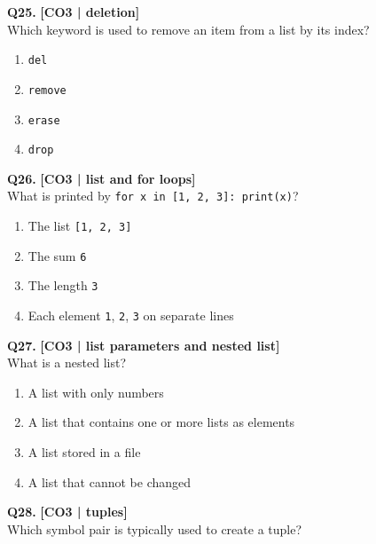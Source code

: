 \noindent\textbf{Q25.} \hfill {\small\color{LPUOrange}\textbf{[CO3 | deletion]}}\\[2pt]
Which keyword is used to remove an item from a list by its index?

\begin{enumerate}[label=(\alph*),topsep=2pt,itemsep=1pt,partopsep=0pt,parsep=0pt]
    \item \relax \texttt{del}
    \item \relax \texttt{remove}
    \item \relax \texttt{erase}
    \item \relax \texttt{drop}
\end{enumerate}
\vspace{{2mm}}

\noindent\textbf{Q26.} \hfill {\small\color{LPUOrange}\textbf{[CO3 | list and for loops]}}\\[2pt]
What is printed by \texttt{for x in [1, 2, 3]: print(x)}?

\begin{enumerate}[label=(\alph*),topsep=2pt,itemsep=1pt,partopsep=0pt,parsep=0pt]
    \item \relax The list \texttt{[1, 2, 3]}
    \item \relax The sum \texttt{6}
    \item \relax The length \texttt{3}
    \item \relax Each element \texttt{1}, \texttt{2}, \texttt{3} on separate lines
\end{enumerate}
\vspace{{2mm}}

\noindent\textbf{Q27.} \hfill {\small\color{LPUOrange}\textbf{[CO3 | list parameters and nested list]}}\\[2pt]
What is a nested list?

\begin{enumerate}[label=(\alph*),topsep=2pt,itemsep=1pt,partopsep=0pt,parsep=0pt]
    \item \relax A list with only numbers
    \item \relax A list that contains one or more lists as elements
    \item \relax A list stored in a file
    \item \relax A list that cannot be changed
\end{enumerate}
\vspace{{2mm}}

\noindent\textbf{Q28.} \hfill {\small\color{LPUOrange}\textbf{[CO3 | tuples]}}\\[2pt]
Which symbol pair is typically used to create a tuple?

